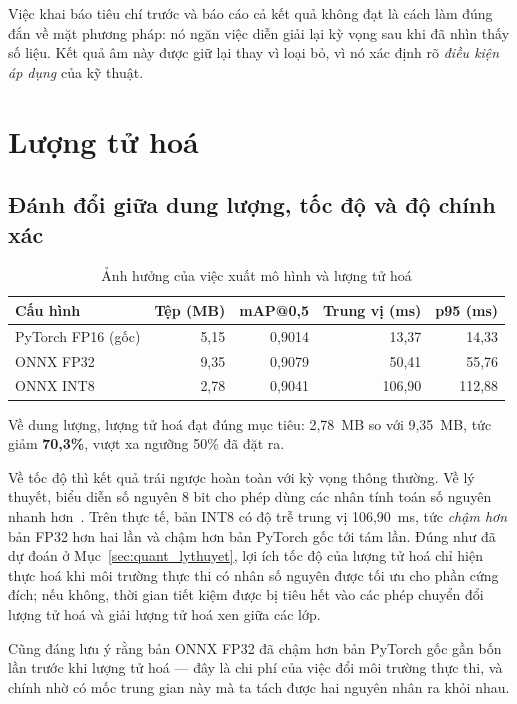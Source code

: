 Việc khai báo tiêu chí trước và báo cáo cả kết quả không đạt là cách làm đúng đắn về mặt phương
pháp: nó ngăn việc diễn giải lại kỳ vọng sau khi đã nhìn thấy số liệu. Kết quả âm này được giữ lại
thay vì loại bỏ, vì nó xác định rõ \emph{điều kiện áp dụng} của kỹ thuật.

\section{Lượng tử hoá}

\subsection{Đánh đổi giữa dung lượng, tốc độ và độ chính xác}

\begin{table}[H]
\centering
\caption{Ảnh hưởng của việc xuất mô hình và lượng tử hoá}
\label{tab:quant}
\small
\begin{tabular}{lrrrr}
\toprule
\textbf{Cấu hình} & \textbf{Tệp (MB)} & \textbf{mAP@0,5} & \textbf{Trung vị (ms)} & \textbf{p95 (ms)} \\
\midrule
PyTorch FP16 (gốc) & 5,15 & 0,9014 & 13,37  & 14,33 \\
ONNX FP32          & 9,35 & 0,9079 & 50,41  & 55,76 \\
ONNX INT8          & 2,78 & 0,9041 & 106,90 & 112,88 \\
\bottomrule
\end{tabular}
\end{table}

Về dung lượng, lượng tử hoá đạt đúng mục tiêu: 2,78~MB so với 9,35~MB, tức giảm \textbf{70,3\%},
vượt xa ngưỡng 50\% đã đặt ra.

Về tốc độ thì kết quả trái ngược hoàn toàn với kỳ vọng thông thường. Về lý thuyết, biểu diễn số
nguyên 8 bit cho phép dùng các nhân tính toán số nguyên nhanh
hơn~\cite{jacob2018quantization}. Trên thực tế, bản INT8 có độ trễ trung vị 106,90~ms, tức
\emph{chậm hơn} bản FP32 hơn hai lần và chậm hơn bản PyTorch gốc tới tám lần. Đúng như đã dự đoán ở
Mục~\ref{sec:quant_lythuyet}, lợi ích tốc độ của lượng tử hoá chỉ hiện thực hoá khi môi trường thực
thi có nhân số nguyên được tối ưu cho phần cứng đích; nếu không, thời gian tiết kiệm được bị tiêu
hết vào các phép chuyển đổi lượng tử hoá và giải lượng tử hoá xen giữa các lớp.

Cũng đáng lưu ý rằng bản ONNX FP32 đã chậm hơn bản PyTorch gốc gần bốn lần trước khi lượng tử hoá
--- đây là chi phí của việc đổi môi trường thực thi, và chính nhờ có mốc trung gian này mà ta tách
được hai nguyên nhân ra khỏi nhau.

